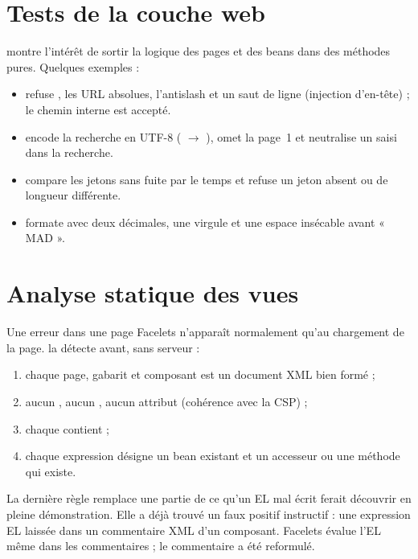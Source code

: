 \section{Tests de la couche web}\label{sec:webchecks}
 montre l'intérêt de sortir la logique des pages et des beans dans des méthodes pures. Quelques exemples :

\begin{itemize}
  \item {} refuse , les URL absolues, l'antislash et un saut de ligne
        (injection d'en-tête) ; le chemin interne est accepté.
  \item {} encode la recherche en UTF-8 ( $\rightarrow$ ),
        omet la page~1 et neutralise un  saisi dans la recherche.
  \item {} compare les jetons sans fuite par le temps et refuse un jeton absent ou de longueur
        différente.
  \item {} formate avec deux décimales, une virgule et une espace insécable avant « MAD ».
\end{itemize}

\section{Analyse statique des vues}\label{sec:vues-checks}
Une erreur dans une page Facelets n'apparaît normalement qu'au chargement de la page.  la détecte avant, sans serveur :

\begin{enumerate}
  \item chaque page, gabarit et composant est un document XML bien formé ;
  \item aucun , aucun , aucun attribut  (cohérence avec la CSP) ;
  \item chaque  contient  ;
  \item chaque expression  désigne un bean existant et un accesseur ou une méthode qui existe.
\end{enumerate}

La dernière règle remplace une partie de ce qu'un EL mal écrit ferait découvrir en pleine démonstration. Elle a déjà trouvé
un faux positif instructif : une expression EL laissée dans un commentaire XML d'un composant. Facelets évalue l'EL même dans les
commentaires ; le commentaire a été reformulé.

